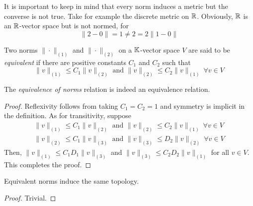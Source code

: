 \begin{mdframed}
    It is important to keep in mind that every norm induces a metric but the converse is not true. Take for example the discrete metric on $\mathbb{R}$. Obviously, $\mathbb{R}$ is an $\mathbb{R}$-vector space but is not normed, for 
    \begin{equation*}
        \|2  - 0\| = 1\ne 2 = 2\|1 - 0\|
    \end{equation*}
\end{mdframed}

\begin{definition}
    Two norms $\|\cdot\|_{(1)}$ and $\|\cdot\|_{(2)}$ on a $\mathbb K$-vector space $V$ are said to be \textit{equivalent} if there are positive constants $C_1$ and $C_2$ such that 
    \begin{equation*}
        \|v\|_{(1)}\le C_1\|v\|_{(2)}\text{ and }\|v\|_{(2)}\le C_2\|v\|_{(1)}~\forall v\in V
    \end{equation*}
\end{definition}

\begin{proposition}
    The \textit{equivalence of norms} relation is indeed an equivalence relation.
\end{proposition}
\begin{proof}
    Reflexivity follows from taking $C_1 = C_2 = 1$ and symmetry is implicit in the definition. As for transitivity, suppose 
    \begin{align*}
        \|v\|_{(1)}\le C_1\|v\|_{(2)}\text{ and }\|v\|_{(2)}\le C_2\|v\|_{(1)}~\forall v\in V\\
        \|v\|_{(2)}\le C_1\|v\|_{(3)}\text{ and }\|v\|_{(3)}\le D_2\|v\|_{(2)}~\forall v\in V
    \end{align*}
    Then, $\|v\|_{(1)}\le C_1D_1\|v\|_{(3)}$ and $\|v\|_{(3)}\le C_2D_2\|v\|_{(1)}$ for all $v\in V$. This completes the proof.
\end{proof}

\begin{proposition}
    Equivalent norms induce the same topology.
\end{proposition}
\begin{proof}
    Trivial.
\end{proof}

